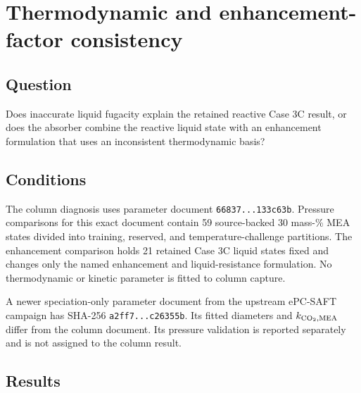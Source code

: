 \section{Thermodynamic and enhancement-factor consistency}
\label{sec:enhancement-pressure-consistency}

\subsection*{Question}

Does inaccurate liquid  fugacity explain the retained reactive Case
3C result, or does the absorber combine the reactive liquid state with an
enhancement formulation that uses an inconsistent thermodynamic basis?

\subsection*{Conditions}

The column diagnosis uses parameter document
\texttt{66837...133c63b}.  Pressure comparisons for this exact
document contain 59 source-backed 30 mass-\% MEA states divided into training,
reserved, and temperature-challenge partitions.  The enhancement comparison
holds 21 retained Case 3C liquid states fixed and changes only the named
enhancement and liquid-resistance formulation.  No thermodynamic or kinetic
parameter is fitted to column capture.

A newer speciation-only parameter document from the upstream ePC-SAFT campaign
has SHA-256 \texttt{a2ff7...c26355b}.  Its fitted diameters and
$k_{\ce{CO2},\mathrm{MEA}}$ differ from the column document.  Its pressure
validation is reported separately and is not assigned to the column result.

\subsection*{Results}

